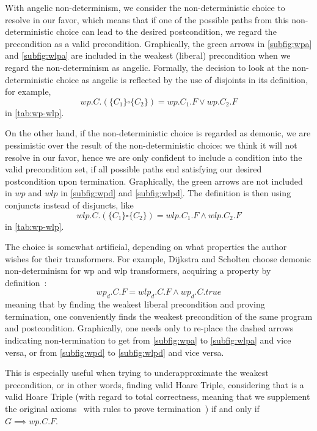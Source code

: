 With angelic non-determinism, we consider the non-deterministic choice to resolve in our favor, which means that if one of the possible paths from this non-deterministic choice can lead to the desired postcondition, we regard the precondition as a valid precondition. 
Graphically, the green arrows in \autoref{subfig:wpa} and \autoref{subfig:wlpa} are included in the weakest (liberal) precondition when we regard the non-determinism as angelic. 
Formally, the decision to look at the non-deterministic choice as angelic is reflected by the use of disjoints in its definition, for example, 
$$wp.C.(\{C_1\}\square \{C_2\}) = wp.C_1.F\vee wp.C_2.F$$ in \autoref{tab:wp-wlp}.

On the other hand, if the non-deterministic choice is regarded as demonic, we are pessimistic over the result of the non-deterministic choice: we think it will not resolve in our favor, hence we are only confident to include a condition into the valid precondition set, if all possible paths end satisfying our desired postcondition upon termination. 
Graphically, the green arrows are not included in $wp$ and $wlp$ in \autoref{subfig:wpd} and \autoref{subfig:wlpd}. 
The definition is then using conjuncts instead of disjuncts, like 
$$wlp.C.(\{C_1\}\square \{C_2\}) = wlp.C_1.F\wedge wlp.C_2.F$$  in \autoref{tab:wp-wlp}.

The choice is somewhat artificial, depending on what properties the author wishes for their transformers.
For example, Dijkstra and Scholten choose demonic non-determinism for wp and wlp transformers, acquiring a property by definition~\cite{dijkstra90}: 
$$wp_d.C.F = wlp_d.C.F \wedge wp_d.C.true $$
meaning that by finding the weakest liberal precondition and proving termination, one conveniently finds the weakest precondition of the same program and postcondition. 
Graphically, one needs only to re-place the dashed arrows indicating non-termination to get from \autoref{subfig:wpa} to \autoref{subfig:wlpa} and vice versa, or from  \autoref{subfig:wpd} to \autoref{subfig:wlpd} and vice versa. 

This is especially useful when trying to underapproximate the weakest precondition, %
or in other words, finding valid Hoare Triple, considering that  is a valid Hoare Triple (with regard to total correctness, meaning that we supplement the original axioms~\cite{hoare69} with rules to prove termination~\cite{manna74}) if and only if $G\implies wp.C.F$.

